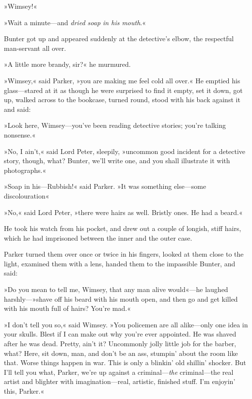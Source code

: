 »Wimsey!«

»Wait a minute\allowbreak---\allowbreak and \textit{dried soap in his mouth}.«

Bunter got up and appeared suddenly at the detective's elbow, the respectful man-servant all over.

»A little more brandy, sir?« he murmured.

»Wimsey,« said Parker, »you are making me feel cold all over.« He emptied his glass\allowbreak---\allowbreak stared at it as though he were surprised to find it empty, set it down, got up, walked across to the bookcase, turned round, stood with his back against it and said:

»Look here, Wimsey\allowbreak---\allowbreak you've been reading detective stories; you're talking nonsense.«

»No, I ain't,« said Lord Peter, sleepily, »uncommon good incident for a detective story, though, what? Bunter, we'll write one, and you shall illustrate it with photographs.«

»Soap in his\allowbreak---\allowbreak Rubbish!« said Parker. »It was something else\allowbreak---\allowbreak some discolouration\longdash«

»No,« said Lord Peter, »there were hairs as well. Bristly ones. He had a beard.«

He took his watch from his pocket, and drew out a couple of longish, stiff hairs, which he had imprisoned between the inner and the outer case.

Parker turned them over once or twice in his fingers, looked at them close to the light, examined them with a lens, handed them to the impassible Bunter, and said:

»Do you mean to tell me, Wimsey, that any man alive would«---he laughed harshly---»shave off his beard with his mouth open, and then go and get killed with his mouth full of hairs? You're mad.«

»I don't tell you so,« said Wimsey. »You policemen are all alike\allowbreak---\allowbreak only one idea in your skulls. Blest if I can make out why you're ever appointed. He was shaved after he was dead. Pretty, ain't it? Uncommonly jolly little job for the barber, what? Here, sit down, man, and don't be an ass, stumpin' about the room like that. Worse things happen in war. This is only a blinkin' old shillin' shocker. But I'll tell you what, Parker, we're up against a criminal---\textit{the} criminal\allowbreak---\allowbreak the real artist and blighter with imagination\allowbreak---\allowbreak real, artistic, finished stuff. I'm enjoyin' this, Parker.«
